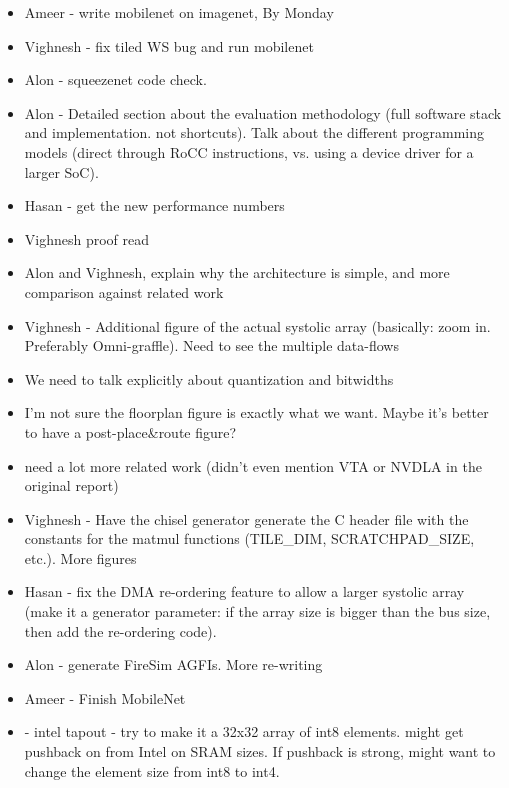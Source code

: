 \begin{itemize}
    \item Ameer - write mobilenet on imagenet, By Monday
    \item Vighnesh - fix tiled WS bug and run mobilenet
    \item Alon - squeezenet code check.
    \item Alon - Detailed section about the evaluation methodology (full software stack and implementation. not shortcuts). Talk about the different programming models (direct through RoCC instructions, vs. using a device driver for a larger SoC).
    \item Hasan - get the new performance numbers 
    \item Vighnesh proof read
    \item Alon and Vighnesh, explain why the architecture is simple, and more comparison against related work
    
    \item Vighnesh - Additional figure of the actual systolic array (basically: zoom in. Preferably Omni-graffle). Need to see the multiple data-flows
    \item We need to talk explicitly about quantization and bitwidths
    \item I'm not sure the floorplan figure is exactly what we want. Maybe it's better to have a post-place&route figure?
    \item need a lot more related work (didn't even mention VTA or NVDLA in the original report)
    
    \item Vighnesh - Have the chisel generator generate the C header file with the constants for the matmul functions (TILE\_DIM, SCRATCHPAD\_SIZE, etc.). More figures
    \item Hasan - fix the DMA re-ordering feature to allow a larger systolic array (make it a generator parameter: if the array size is bigger than the bus size, then add the re-ordering code). 
    \item Alon - generate FireSim AGFIs. More re-writing
    \item Ameer - Finish MobileNet
    \item - intel tapout - try to make it a 32x32 array of int8 elements. might get pushback on from Intel on SRAM sizes. If pushback is strong, might want to change the element size from int8 to int4.
    
    
\end{itemize}
